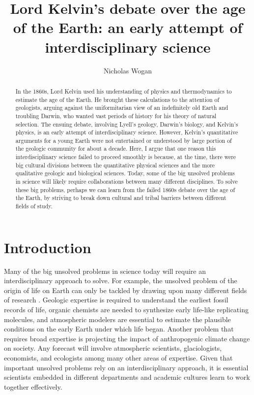 \documentclass[12pt]{article}
\begin{document}
\title{Lord Kelvin's debate over the age of the Earth: an early attempt of interdisciplinary science}
\author{Nicholas Wogan}
\maketitle

\begin{abstract}
  In the 1860s, Lord Kelvin used his understanding of physics and thermodynamics to estimate the age of the Earth. He brought these calculations to the attention of geologists, arguing against the uniformitarian view of an indefinitely old Earth and troubling Darwin, who wanted vast periods of history for his theory of natural selection. The ensuing debate, involving Lyell's geology, Darwin's biology, and Kelvin's physics, is an early attempt of interdisciplinary science. However, Kelvin's quantitative arguments for a young Earth were not entertained or understood by large portion of the geologic community for about a decade. Here, I argue that one reason this interdisciplinary science failed to proceed smoothly is because, at the time, there were big cultural divisions between the quantitative physical sciences and the more qualitative geologic and biological sciences. Today, some of the big unsolved problems in science will likely require collaborations between many different disciplines. To solve these big problems, perhaps we can learn from the failed 1860s debate over the age of the Earth, by striving to break down cultural and tribal barriers between different fields of study.
\end{abstract}

\section{Introduction}

Many of the big unsolved problems in science today will require an interdisciplinary approach to solve. For example, the unsolved problem of the origin of life on Earth can only be tackled by drawing upon many different fields of research \citep{Hays_2015}. Geologic expertise is required to understand the earliest fossil records of life, organic chemists are needed to synthesize early life-like replicating molecules, and atmospheric modelers are essential to estimate the plausible conditions on the early Earth under which life began. Another problem that requires broad expertise is projecting the impact of anthropogenic climate change on society. Any forecast will involve atmospheric scientists, glaciologists, economists, and ecologists among many other areas of expertise. Given that important unsolved problems rely on an interdisciplinary approach, it is essential scientists embedded in different departments and academic cultures learn to work together effectively.
\end{document}
